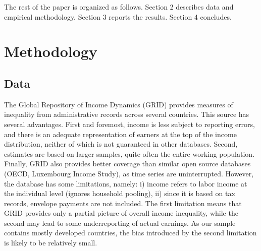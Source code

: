 \documentclass[12pt, a4paper]{article}
\begin{document}

The rest of the paper is organized as follows. Section 2 describes data and empirical methodology. Section 3 reports the results. Section 4 concludes.


\section{Methodology}

\subsection{Data} 
The Global Repository of Income Dynamics (GRID) provides measures of inequality from administrative records across several countries. This source has several advantages. First and foremost, income is less subject to reporting errors, and there is an adequate representation of earners at the top of the income distribution, neither of which is not guaranteed in other databases. Second, estimates are based on larger samples, quite often the entire working population. Finally, GRID also provides better coverage than similar open source databases (OECD, Luxembourg Income Study), as time series are uninterrupted. However, the database has some limitations, namely: i) income refers to labor income at the individual level (ignores household pooling), ii) since it is based on tax records, envelope payments are not included. The first limitation means that GRID provides only a partial picture of overall income inequality, while the second may lead to some underreporting of actual earnings. As our sample contains mostly developed countries, the bias introduced by the second limitation is likely to be relatively small.
\end{document}

